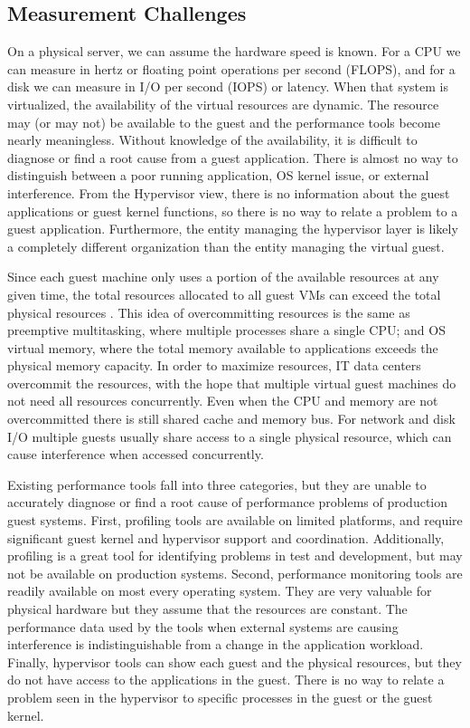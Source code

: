 \subsection{Measurement Challenges}
On a physical server, we can assume the hardware speed is known.  For a CPU we can measure in hertz or floating point operations per second (FLOPS), and for a disk we can measure in I/O per second (IOPS) or latency.  When that system is virtualized, the availability of the virtual resources are dynamic.  The resource may (or may not) be available to the guest and the performance tools become nearly meaningless.  Without knowledge of the availability, it is difficult to diagnose or find a root cause from a guest application. There is almost no way to distinguish between a poor running application, OS kernel issue, or external interference.  From the Hypervisor view, there is no information about the guest applications or guest kernel functions, so there is no way to relate a problem to a guest application.  Furthermore, the entity managing the hypervisor layer is likely a completely different organization than the entity managing the virtual guest. 

Since each guest machine only uses a portion of the available resources at any given time, the total resources allocated to all guest VMs can exceed the total physical resources \cite{huber2, amit, buell1}.   This idea of overcommitting resources is the same as preemptive multitasking, where multiple processes share a single CPU; and OS virtual memory, where the total memory available to applications exceeds the physical memory capacity.  In order to maximize resources, IT data centers overcommit the resources, with the hope that multiple virtual guest machines do not need all resources concurrently.  Even when the CPU and memory are not overcommitted there is still shared cache and memory bus.  For network and disk I/O multiple guests usually share access to a single physical resource, which can cause interference when accessed concurrently.

Existing performance tools fall into three categories, but they are unable to accurately diagnose or find a root cause of performance problems of production guest systems.  First, profiling tools are available on limited platforms, and require significant guest kernel and hypervisor support and coordination.  Additionally, profiling is a great tool for identifying problems in test and development, but may not be available on production systems.  
Second, performance monitoring tools are readily available on most every operating system.  They are very valuable for physical hardware but they assume that the resources are constant.  The performance data used by the tools when external systems are causing interference is indistinguishable from a change in the application workload.
Finally, hypervisor tools can show each guest and the physical resources, but they do not have access to the applications in the guest.  There is no way to relate a problem seen in the hypervisor to specific processes in the guest or the guest kernel. 

